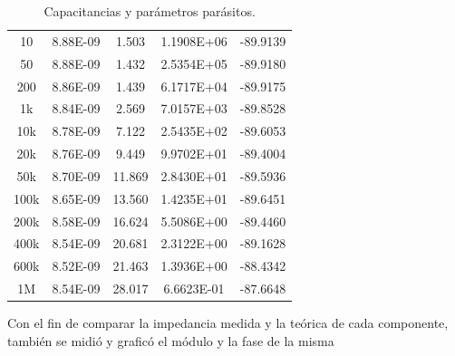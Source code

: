 \begin{table}[H]
\begin{minipage}{0.48\textwidth}
\begin{tabular}{ccccc}
    \midrule
    10     & 8.88E-09 & 1.503 & 1.1908E+06 & -89.9139 \\
    50     & 8.88E-09 & 1.432 & 2.5354E+05 & -89.9180 \\
    200    & 8.86E-09 & 1.439 & 6.1717E+04 & -89.9175 \\
    1k     & 8.84E-09 & 2.569 & 7.0157E+03 & -89.8528 \\
    10k    & 8.78E-09 & 7.122 & 2.5435E+02 & -89.6053 \\
    20k    & 8.76E-09 & 9.449 & 9.9702E+01 & -89.4004 \\
    50k    & 8.70E-09 & 11.869 & 2.8430E+01 & -89.5936 \\
    100k   & 8.65E-09 & 13.560 & 1.4235E+01 & -89.6451 \\
    200k   & 8.58E-09 & 16.624 & 5.5086E+00 & -89.4460 \\
    400k   & 8.54E-09 & 20.681 & 2.3122E+00 & -89.1628 \\
    600k   & 8.52E-09 & 21.463 & 1.3936E+00 & -88.4342 \\
    1M     & 8.54E-09 & 28.017 & 6.6623E-01 & -87.6648 \\
    \bottomrule
    \end{tabular}
    \caption{Capacitancias y parámetros parásitos.}
    \label{tabla:capacitancias}
\end{minipage}

\end{table}

Con el fin de comparar la impedancia medida y la teórica de cada componente, también se midió y graficó el módulo y la fase de la misma


